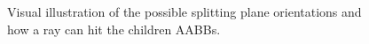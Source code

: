 \documentclass{PoliMi_MasterThesis}
\begin{document}
\begin{figure}[H]
    \centering
	\qquad
	\qquad
    \caption{Visual illustration of the possible splitting plane orientations and how a ray can hit the children AABBs.}
    \label{fig:ray_facing_simplest_case}
\end{figure}
\end{document}
